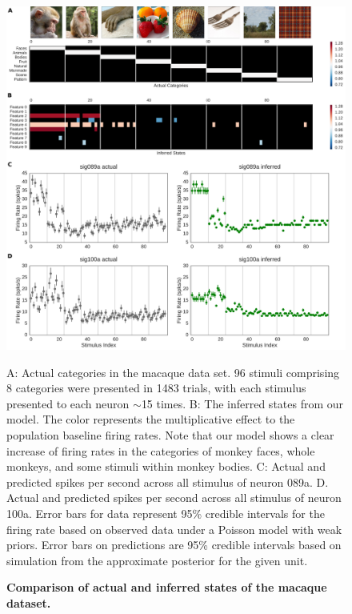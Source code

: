 \documentclass[10pt,letterpaper]{article}
\begin{document}
\begin{figure}[!h]
    \includegraphics[width=\linewidth]{figures/imgclust}
	\caption{\bf Comparison of actual and inferred states of the macaque dataset.}
	A: Actual categories in the macaque data set. 96 stimuli comprising 8 categories were presented in 1483 trials, with each stimulus presented to each neuron $\sim$15 times. B: The inferred states from our model. The color represents the multiplicative effect to the population baseline firing rates. Note that our model shows a clear increase of firing rates in the categories of monkey faces, whole monkeys, and some stimuli within monkey bodies. C: Actual and predicted spikes per second across all stimulus of neuron 089a. D. Actual and predicted spikes per second across all stimulus of neuron 100a. Error bars for data represent 95\% credible intervals for the firing rate based on observed data under a Poisson model with weak priors. Error bars on predictions are 95\% credible intervals based on simulation from the approximate posterior for the given unit.
	\label{fig:imgclust}
\end{figure}
\end{document}
